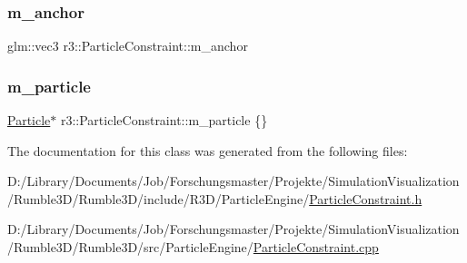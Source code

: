 \subsubsection{\texorpdfstring{m\+\_\+anchor}{m\_anchor}}
{\footnotesize\ttfamily glm\+::vec3 r3\+::\+Particle\+Constraint\+::m\+\_\+anchor\hspace{0.3cm}{\ttfamily [protected]}}

\mbox{\label{classr3_1_1_particle_constraint_ad6a80699b1e0579c4a307f3a7ac49d26}} 
\subsubsection{\texorpdfstring{m\+\_\+particle}{m\_particle}}
{\footnotesize\ttfamily \mbox{\hyperlink{classr3_1_1_particle}{Particle}}$\ast$ r3\+::\+Particle\+Constraint\+::m\+\_\+particle \{\}\hspace{0.3cm}{\ttfamily [protected]}}



The documentation for this class was generated from the following files\+:\begin{DoxyCompactItemize}
\item 
D\+:/\+Library/\+Documents/\+Job/\+Forschungsmaster/\+Projekte/\+Simulation\+Visualization/\+Rumble3\+D/\+Rumble3\+D/include/\+R3\+D/\+Particle\+Engine/\mbox{\hyperlink{_particle_constraint_8h}{Particle\+Constraint.\+h}}\item 
D\+:/\+Library/\+Documents/\+Job/\+Forschungsmaster/\+Projekte/\+Simulation\+Visualization/\+Rumble3\+D/\+Rumble3\+D/src/\+Particle\+Engine/\mbox{\hyperlink{_particle_constraint_8cpp}{Particle\+Constraint.\+cpp}}\end{DoxyCompactItemize}
